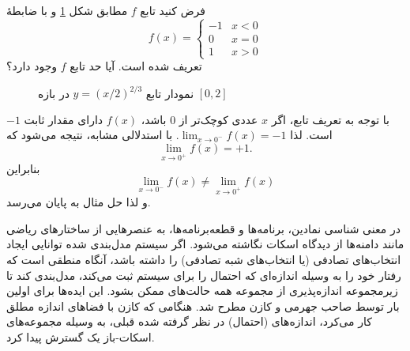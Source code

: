 \begin{example}
فرض کنید تابع $f$ مطابق شکل \ref{fig1-2} 
و با ضابطهٔ
\[
f(x)=\left\{\begin{array}{ll}
-1 & x<0\\
0 & x=0\\
1 & x>0
\end{array} \right.
\]
تعریف شده است. آیا حد%
  تابع $f$ وجود دارد؟
\end{example}
\begin{figure}[!h]
\centering
{}
\caption{نمودار تابع  $y=({x}/{2})^{2/3}$ در بازه $[0,2]$}
\label{fig1-2}
\end{figure}
\begin{solution}
با توجه به تعریف تابع، اگر $x$ عددی کوچک‌تر از $0$ باشد، $f(x)$ دارای مقدار ثابت $-1$ است. لذا
$\lim_{x\rightarrow 0^{-}} f(x)=-1$.
با استدلالی مشابه، نتیجه می‌شود که 
$$\lim_{x\rightarrow 0^{+}} f(x)=+1.$$
بنابراین
\[
\lim_{x\rightarrow 0^{-}} f(x)\neq \lim_{x\rightarrow 0^{+}} f(x)
\]
و لذا حل مثال به پایان می‌رسد.
\end{solution}
\paragraphfootnotes

در معنی شناسی نمادین، برنامه‌ها و قطعه‌برنامه‌ها، به عنصرهایی از ساختارهای ریاضی مانند دامنه‌ها از دیدگاه اسکات نگاشته می‌شود. اگر سیستم مدل‌بندی شده توانایی ایجاد انتخاب‌های تصادفی (یا انتخاب‌های 
شبه تصادفی) را داشته باشد، آنگاه منطقی است که رفتار خود را به وسیله اندازه‌ای که احتمال را برای سیستم ثبت
 می‌کند، مدل‌بندی کند تا زیرمجموعه‌ اندازه‌پذیری از مجموعه همه حالت‌های ممکن بشود. این ایده‌ها برای اولین بار توسط صاحب ‌جهرمی و کازن
مطرح شد. هنگامی که کازن با فضاهای اندازه مطلق کار می‌کرد، اندازه‌های (احتمال) در نظر گرفته شده قبلی، به وسیله مجموعه‌های اسکات-باز یک  گسترش پیدا کرد.

